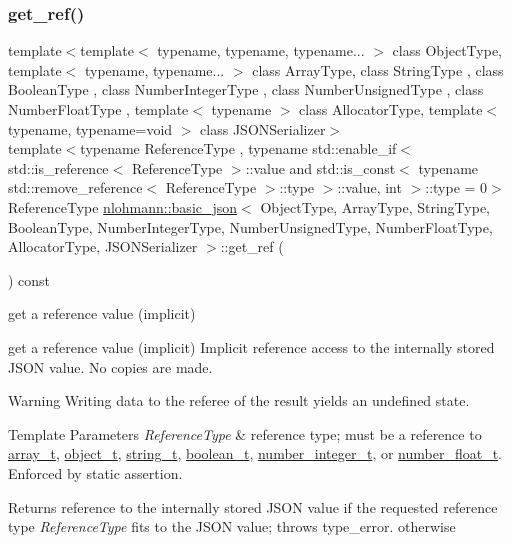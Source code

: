 \subsubsection{\texorpdfstring{get\+\_\+ref()}{get\_ref()}\hspace{0.1cm}{\footnotesize\ttfamily [2/2]}}
{\footnotesize\ttfamily template$<$template$<$ typename, typename, typename... $>$ class Object\+Type, template$<$ typename, typename... $>$ class Array\+Type, class String\+Type , class Boolean\+Type , class Number\+Integer\+Type , class Number\+Unsigned\+Type , class Number\+Float\+Type , template$<$ typename $>$ class Allocator\+Type, template$<$ typename, typename=void $>$ class J\+S\+O\+N\+Serializer$>$ \\
template$<$typename Reference\+Type , typename std\+::enable\+\_\+if$<$ std\+::is\+\_\+reference$<$ Reference\+Type $>$\+::value and std\+::is\+\_\+const$<$ typename std\+::remove\+\_\+reference$<$ Reference\+Type $>$\+::type $>$\+::value, int $>$\+::type  = 0$>$ \\
Reference\+Type \hyperlink{classnlohmann_1_1basic__json}{nlohmann\+::basic\+\_\+json}$<$ Object\+Type, Array\+Type, String\+Type, Boolean\+Type, Number\+Integer\+Type, Number\+Unsigned\+Type, Number\+Float\+Type, Allocator\+Type, J\+S\+O\+N\+Serializer $>$\+::get\+\_\+ref (\begin{DoxyParamCaption}{ }\end{DoxyParamCaption}) const\hspace{0.3cm}{\ttfamily [inline]}}



get a reference value (implicit) 

get a reference value (implicit) Implicit reference access to the internally stored J\+S\+ON value. No copies are made.

\begin{DoxyWarning}{Warning}
Writing data to the referee of the result yields an undefined state.
\end{DoxyWarning}

\begin{DoxyTemplParams}{Template Parameters}
{\em Reference\+Type} & reference type; must be a reference to \hyperlink{classnlohmann_1_1basic__json_ae095578e03df97c5b3991787f1056374}{array\+\_\+t}, \hyperlink{classnlohmann_1_1basic__json_a5e48a7893520e1314bf0c9723e26ea2a}{object\+\_\+t}, \hyperlink{classnlohmann_1_1basic__json_a61f8566a1a85a424c7266fb531dca005}{string\+\_\+t}, \hyperlink{classnlohmann_1_1basic__json_a4c919102a9b4fe0d588af64801436082}{boolean\+\_\+t}, \hyperlink{classnlohmann_1_1basic__json_a98e611d67b7bd75307de99c9358ab2dc}{number\+\_\+integer\+\_\+t}, or \hyperlink{classnlohmann_1_1basic__json_a88d6103cb3620410b35200ee8e313d97}{number\+\_\+float\+\_\+t}. Enforced by static assertion.\\
\hline
\end{DoxyTemplParams}
\begin{DoxyReturn}{Returns}
reference to the internally stored J\+S\+ON value if the requested reference type {\itshape Reference\+Type} fits to the J\+S\+ON value; throws type\+\_\+error. otherwise
\end{DoxyReturn}

